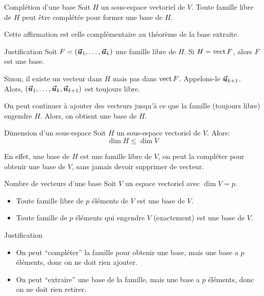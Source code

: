 \documentclass[a4paper]{article}
\begin{document}
\begin{parag}{Complétion d'une base}
    Soit $H$ un sous-espace vectoriel de $V$. Toute famille libre de $H$ peut être complétée pour former une base de $H$.

    Cette affirmation est celle complémentaire au théorème de la base extraite.

    \begin{subparag}{Justification}
        Soit $F = \left(\bvec{u}_1, \ldots, \bvec{u}_k\right)$ une famille libre de $H$. Si $H = \operatorname{vect} F$, alors $F$ est une base.

        Sinon, il existe un vecteur dans $H$ mais pas dans $\operatorname{vect} F$. Appelons-le $\bm{\protect\vec{u}}_{k+1}$. Alors, $\left(\bvec{u}_1, \ldots, \bvec{u}_k, \bvec{u}_{k+1}\right)$ est toujours libre.

        On peut continuer  à ajouter des vecteurs jusqu'à ce que la famille (toujours libre) engendre $H$. Alors, on obtient une base de $H$.
    \end{subparag}
\end{parag}

\begin{parag}{Dimension d'un sous-espace}
    Soit $H$ un sous-espace vectoriel de $V$. Alors:
    \[\dim H \leq \dim V\]

    En effet, une base de $H$ est une famille libre de $V$, on peut la compléter pour obtenir une base de $V$, sans jamais devoir supprimer de vecteur.
\end{parag}


\begin{parag}{Nombre de vecteurs d'une base}
    Soit $V$ un espace vectoriel avec $\dim V = p$.
    \begin{itemize}
        \item Toute famille libre de $p$ éléments de $V$ est une base de $V$.
        \item Toute famille de $p$ éléments qui engendre $V$ (exactement) est une base de $V$.
    \end{itemize}

    \begin{subparag}{Justification}
        \begin{itemize}[left=0pt]
            \item On peut ``compléter'' la famille pour obtenir une base, mais une base a $p$ éléments, donc on ne doit rien ajouter.
            \item On peut ``extraire'' une base de la famille, mais une base a $p$ éléments, donc on ne doit rien retirer.
        \end{itemize}

    \end{subparag}

\end{parag}
\end{document}
